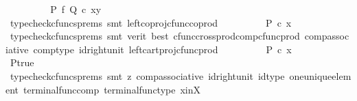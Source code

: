 \begin{isabellebody}
\ \ \ \ \ \ \isamarkupfalse%
\ \isamarkupfalse%
\ {\isachardoublequoteopen}{\isacharparenleft}{\kern0pt}P\ {\isasymtimes}\isactrlsub f\ Q{\isacharparenright}{\kern0pt}\ {\isasymcirc}\isactrlsub c\ {\isasymlangle}x{\isacharcomma}{\kern0pt}y{\isasymrangle}\ {\isacharequal}{\kern0pt}\ {\isasymlangle}{\isasymf}{\isacharcomma}{\kern0pt}{\isasymf}{\isasymrangle}{\isachardoublequoteclose}\isanewline
\ \ \ \ \ \ \ \ \isamarkupfalse%
\ {\isacharparenleft}{\kern0pt}typecheck{\isacharunderscore}{\kern0pt}cfuncs{\isacharunderscore}{\kern0pt}prems{\isacharcomma}{\kern0pt}\ smt\ left{\isacharunderscore}{\kern0pt}coproj{\isacharunderscore}{\kern0pt}cfunc{\isacharunderscore}{\kern0pt}coprod{\isacharparenright}{\kern0pt}\isanewline
\ \ \ \ \ \ \isamarkupfalse%
\ \isamarkupfalse%
\ {\isachardoublequoteopen}P\ {\isasymcirc}\isactrlsub c\ x\ {\isacharequal}{\kern0pt}\ {\isasymf}{\isachardoublequoteclose}\isanewline
\ \ \ \ \ \ \ \ \isamarkupfalse%
\ {\isacharparenleft}{\kern0pt}typecheck{\isacharunderscore}{\kern0pt}cfuncs{\isacharunderscore}{\kern0pt}prems{\isacharcomma}{\kern0pt}\ smt\ {\isacharparenleft}{\kern0pt}verit{\isacharcomma}{\kern0pt}\ best{\isacharparenright}{\kern0pt}\ cfunc{\isacharunderscore}{\kern0pt}cross{\isacharunderscore}{\kern0pt}prod{\isacharunderscore}{\kern0pt}comp{\isacharunderscore}{\kern0pt}cfunc{\isacharunderscore}{\kern0pt}prod\ comp{\isacharunderscore}{\kern0pt}associative{}\ comp{\isacharunderscore}{\kern0pt}type\ id{\isacharunderscore}{\kern0pt}right{\isacharunderscore}{\kern0pt}unit{}\ left{\isacharunderscore}{\kern0pt}cart{\isacharunderscore}{\kern0pt}proj{\isacharunderscore}{\kern0pt}cfunc{\isacharunderscore}{\kern0pt}prod{\isacharparenright}{\kern0pt}\isanewline
\ \ \ \ \ \ \isamarkupfalse%
\ \isamarkupfalse%
\ {\isachardoublequoteopen}P\ {\isasymcirc}\isactrlsub c\ x\ {\isacharequal}{\kern0pt}\ {\isasymt}{\isachardoublequoteclose}\isanewline
\ \ \ \ \ \ \ \ \isamarkupfalse%
\ P{\isacharunderscore}{\kern0pt}true\ \isamarkupfalse%
\ {\isacharparenleft}{\kern0pt}typecheck{\isacharunderscore}{\kern0pt}cfuncs{\isacharunderscore}{\kern0pt}prems{\isacharcomma}{\kern0pt}\ smt\ {\isacharparenleft}{\kern0pt}z{}{\isacharparenright}{\kern0pt}\ comp{\isacharunderscore}{\kern0pt}associative{}\ id{\isacharunderscore}{\kern0pt}right{\isacharunderscore}{\kern0pt}unit{}\ id{\isacharunderscore}{\kern0pt}type\ one{\isacharunderscore}{\kern0pt}unique{\isacharunderscore}{\kern0pt}element\ terminal{\isacharunderscore}{\kern0pt}func{\isacharunderscore}{\kern0pt}comp\ terminal{\isacharunderscore}{\kern0pt}func{\isacharunderscore}{\kern0pt}type\ x{\isacharunderscore}{\kern0pt}in{\isacharunderscore}{\kern0pt}X{\isacharparenright}{\kern0pt}\isanewline

\end{isabellebody}
